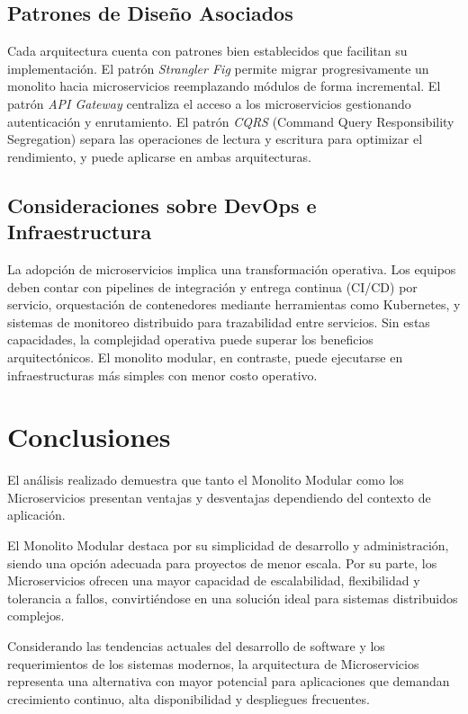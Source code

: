 \documentclass[12pt,a4paper]{article}
\begin{document}
\subsection{Patrones de Diseño Asociados}

Cada arquitectura cuenta con patrones bien establecidos que facilitan su implementación. El patrón \textit{Strangler Fig} permite migrar progresivamente un monolito hacia microservicios reemplazando módulos de forma incremental. El patrón \textit{API Gateway} centraliza el acceso a los microservicios gestionando autenticación y enrutamiento. El patrón \textit{CQRS} (Command Query Responsibility Segregation) separa las operaciones de lectura y escritura para optimizar el rendimiento, y puede aplicarse en ambas arquitecturas.

\subsection{Consideraciones sobre DevOps e Infraestructura}

La adopción de microservicios implica una transformación operativa. Los equipos deben contar con pipelines de integración y entrega continua (CI/CD) por servicio, orquestación de contenedores mediante herramientas como Kubernetes, y sistemas de monitoreo distribuido para trazabilidad entre servicios. Sin estas capacidades, la complejidad operativa puede superar los beneficios arquitectónicos. El monolito modular, en contraste, puede ejecutarse en infraestructuras más simples con menor costo operativo.

\section{Conclusiones}

El análisis realizado demuestra que tanto el Monolito Modular como los Microservicios presentan ventajas y desventajas dependiendo del contexto de aplicación.

El Monolito Modular destaca por su simplicidad de desarrollo y administración, siendo una opción adecuada para proyectos de menor escala. Por su parte, los Microservicios ofrecen una mayor capacidad de escalabilidad, flexibilidad y tolerancia a fallos, convirtiéndose en una solución ideal para sistemas distribuidos complejos.

Considerando las tendencias actuales del desarrollo de software y los requerimientos de los sistemas modernos, la arquitectura de Microservicios representa una alternativa con mayor potencial para aplicaciones que demandan crecimiento continuo, alta disponibilidad y despliegues frecuentes.
\end{document}
